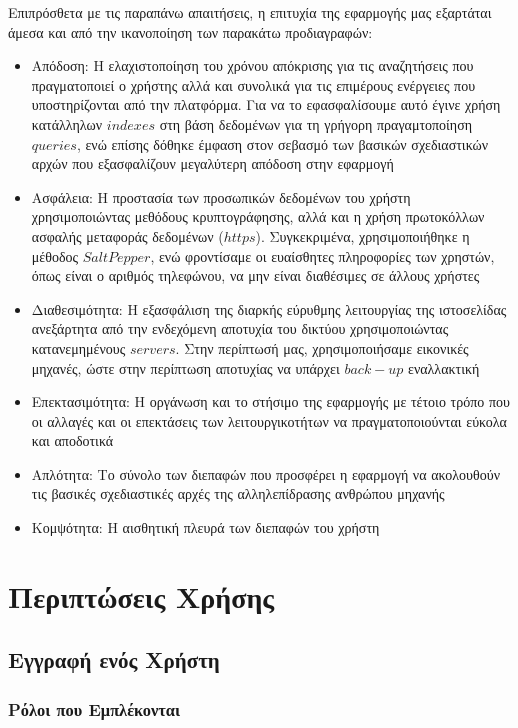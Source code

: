 \documentclass[12pt]{article}
\begin{document}
Επιπρόσθετα με τις παραπάνω απαιτήσεις, η επιτυχία της εφαρμογής μας εξαρτάται άμεσα και από την ικανοποίηση των παρακάτω προδιαγραφών:

\begin{itemize}
\item Απόδοση: Η ελαχιστοποίηση του χρόνου απόκρισης για τις αναζητήσεις που πραγματοποιεί ο χρήστης αλλά και συνολικά για τις επιμέρους ενέργειες που υποστηρίζονται από την πλατφόρμα. Για να το εφασφαλίσουμε αυτό έγινε χρήση κατάλληλων $indexes$ στη βάση δεδομένων για τη γρήγορη πραγαμτοποίηση $queries$, ενώ επίσης δόθηκε έμφαση στον σεβασμό των βασικών σχεδιαστικών αρχών που εξασφαλίζουν μεγαλύτερη απόδοση στην εφαρμογή
\item Ασφάλεια: Η προστασία των προσωπικών δεδομένων του χρήστη χρησιμοποιώντας μεθόδους κρυπτογράφησης, αλλά και η χρήση πρωτοκόλλων ασφαλής μεταφοράς δεδομένων ($https$). Συγκεκριμένα, χρησιμοποιήθηκε η μέθοδος $SaltPepper$, ενώ φροντίσαμε οι ευαίσθητες πληροφορίες των χρηστών, όπως είναι ο αριθμός τηλεφώνου, να μην είναι διαθέσιμες σε άλλους χρήστες
\item Διαθεσιμότητα: Η εξασφάλιση της διαρκής εύρυθμης λειτουργίας της ιστοσελίδας ανεξάρτητα από την ενδεχόμενη αποτυχία του δικτύου χρησιμοποιώντας κατανεμημένους $servers$. Στην περίπτωσή μας, χρησιμοποιήσαμε εικονικές μηχανές, ώστε στην περίπτωση αποτυχίας να υπάρχει $back-up$ εναλλακτική
\item Επεκτασιμότητα: Η οργάνωση και το στήσιμο της εφαρμογής με τέτοιο τρόπο που οι αλλαγές και οι επεκτάσεις των λειτουργικοτήτων να πραγματοποιούνται εύκολα και αποδοτικά
\item Απλότητα: Το σύνολο των διεπαφών που προσφέρει η εφαρμογή να ακολουθούν τις βασικές σχεδιαστικές αρχές της αλληλεπίδρασης ανθρώπου μηχανής
\item Κομψότητα: Η αισθητική πλευρά των διεπαφών του χρήστη
\end{itemize}



\section{Περιπτώσεις Χρήσης}

\subsection{Εγγραφή ενός Χρήστη}

\subsubsection{Ρόλοι που Εμπλέκονται}
\end{document}
